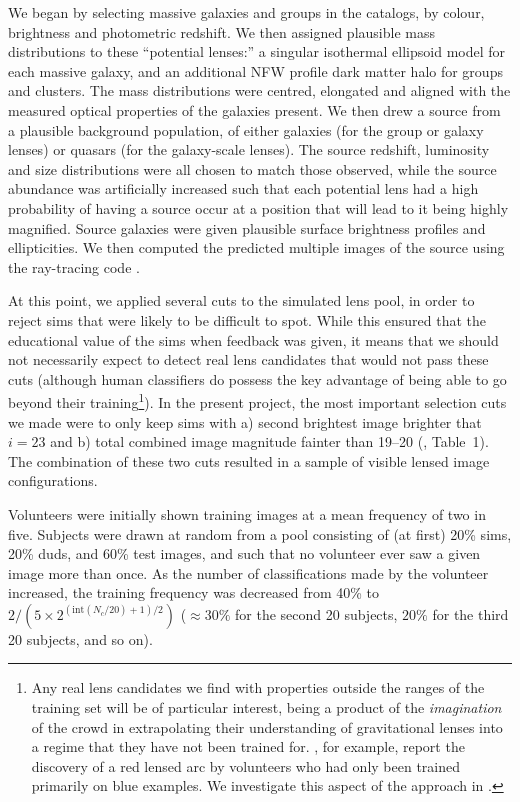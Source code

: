 \documentclass[useAMS,usenatbib,a4paper]{mn2e}
\begin{document}
We began by selecting massive galaxies and groups in the \cfhtls catalogs,
by colour, brightness and photometric redshift. We then assigned plausible mass
distributions to these ``potential lenses:'' a singular isothermal ellipsoid
model for each massive galaxy, and an additional NFW profile dark matter halo
for groups and clusters. The mass distributions were centred, elongated and
aligned with the measured optical properties of the galaxies present. We then
drew a source from a plausible background population, of either galaxies (for
the group or galaxy lenses) or quasars (for the galaxy-scale lenses). The
source redshift, luminosity and size distributions were all chosen to match
those observed, while the source abundance was artificially increased such that
each potential lens had a high probability of having a source occur at a
position that will lead to it being highly magnified. Source galaxies were
given plausible surface brightness profiles and ellipticities. We then computed
the predicted multiple images of the source using the \gravlens ray-tracing
code \citep{Keeton2000}.

At this point, we applied several cuts to the simulated lens pool, in order to
reject sims that were likely to be difficult to spot. While this ensured that
the educational value of the sims when feedback was given, it means that we
should not necessarily expect to detect real lens candidates that would not pass
these cuts (although human classifiers do possess the key advantage of  being
able to go beyond their training\footnote{Any real lens candidates we find with
properties outside the ranges of the training set will be of particular
interest, being a product of the {\it imagination} of the crowd in extrapolating
their understanding of gravitational lenses into a regime that they have not
been trained for.  \citet{GeachEtal2015}, for example, report the discovery of a
red lensed arc  by volunteers who had only been trained primarily on blue
examples. We investigate this aspect of the \SW approach in \PaperTwo.}).
In the present project, the most important selection cuts we made were to only
keep sims with a) second brightest image brighter that $i = 23$ and b) total
combined image magnitude fainter than 19--20 (\PaperTwo, Table~1). The
combination of these two cuts resulted in a sample of visible lensed image
configurations.

Volunteers were initially shown training images at
a mean frequency of two in five. Subjects were drawn at random from a pool
consisting of (at first) 20\% sims, 20\% duds, and 60\% test images,
and such that no volunteer ever
saw a given image more than once. As the number of classifications made by the
volunteer increased, the training frequency was decreased from 40\% to
$2/(5\times2^{(\textrm{int}(N_c/20)+1)/2})$ ($\approx 30\%$ for the second 20
subjects, $20\%$ for the third 20 subjects, and so on).
\end{document}
